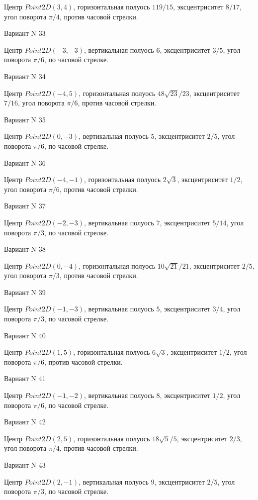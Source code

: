 \documentclass[11pt]{report}
\begin{document}
Центр $Point2D\left(3, 4\right)$, горизонтальная полуось $119 / 15$, эксцентриситет $8 / 17$, угол поворота $\pi / 4$, против часовой стрелки.

Вариант N 33

Центр $Point2D\left(-3, -3\right)$, вертикальная полуось $6$, эксцентриситет $3 / 5$, угол поворота $\pi / 6$, по часовой стрелке.

Вариант N 34

Центр $Point2D\left(-4, 5\right)$, горизонтальная полуось $48 \sqrt{23} / 23$, эксцентриситет $7 / 16$, угол поворота $\pi / 6$, против часовой стрелки.

Вариант N 35

Центр $Point2D\left(0, -3\right)$, вертикальная полуось $5$, эксцентриситет $2 / 5$, угол поворота $\pi / 6$, по часовой стрелке.

Вариант N 36

Центр $Point2D\left(-4, -1\right)$, горизонтальная полуось $2 \sqrt{3}$, эксцентриситет $1 / 2$, угол поворота $\pi / 6$, против часовой стрелки.

Вариант N 37

Центр $Point2D\left(-2, -3\right)$, вертикальная полуось $7$, эксцентриситет $5 / 14$, угол поворота $\pi / 3$, по часовой стрелке.

Вариант N 38

Центр $Point2D\left(0, -4\right)$, горизонтальная полуось $10 \sqrt{21} / 21$, эксцентриситет $2 / 5$, угол поворота $\pi / 3$, против часовой стрелки.

Вариант N 39

Центр $Point2D\left(-1, -3\right)$, вертикальная полуось $5$, эксцентриситет $3 / 4$, угол поворота $\pi / 3$, по часовой стрелке.

Вариант N 40

Центр $Point2D\left(1, 5\right)$, горизонтальная полуось $6 \sqrt{3}$, эксцентриситет $1 / 2$, угол поворота $\pi / 6$, против часовой стрелки.

Вариант N 41

Центр $Point2D\left(-1, -2\right)$, вертикальная полуось $8$, эксцентриситет $1 / 2$, угол поворота $\pi / 6$, по часовой стрелке.

Вариант N 42

Центр $Point2D\left(2, 5\right)$, горизонтальная полуось $18 \sqrt{5} / 5$, эксцентриситет $2 / 3$, угол поворота $\pi / 4$, против часовой стрелки.

Вариант N 43

Центр $Point2D\left(2, -1\right)$, вертикальная полуось $9$, эксцентриситет $2 / 5$, угол поворота $\pi / 3$, по часовой стрелке.
\end{document}
